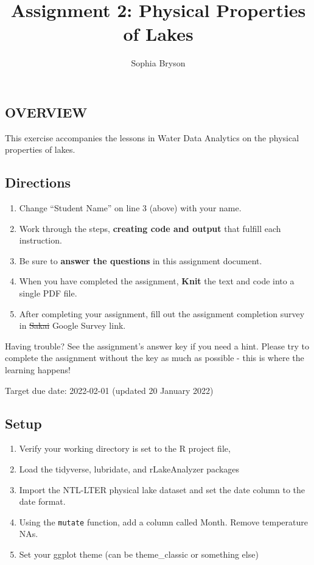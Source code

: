 \documentclass[
]{article}
\title{Assignment 2: Physical Properties of Lakes}
\author{Sophia Bryson}
\date{}
\providecommand{\tightlist}{%
  \setlength{\itemsep}{0pt}\setlength{\parskip}{0pt}}
\begin{document}
\maketitle

\hypertarget{overview}{%
\subsection{OVERVIEW}\label{overview}}

This exercise accompanies the lessons in Water Data Analytics on the
physical properties of lakes.

\hypertarget{directions}{%
\subsection{Directions}\label{directions}}

\begin{enumerate}
\def\labelenumi{\arabic{enumi}.}
\tightlist
\item
  Change ``Student Name'' on line 3 (above) with your name.
\item
  Work through the steps, \textbf{creating code and output} that fulfill
  each instruction.
\item
  Be sure to \textbf{answer the questions} in this assignment document.
\item
  When you have completed the assignment, \textbf{Knit} the text and
  code into a single PDF file.
\item
  After completing your assignment, fill out the assignment completion
  survey in \sout{Sakai} Google Survey link.
\end{enumerate}

Having trouble? See the assignment's answer key if you need a hint.
Please try to complete the assignment without the key as much as
possible - this is where the learning happens!

Target due date: 2022-02-01 (updated 20 January 2022)

\hypertarget{setup}{%
\subsection{Setup}\label{setup}}

\begin{enumerate}
\def\labelenumi{\arabic{enumi}.}
\tightlist
\item
  Verify your working directory is set to the R project file,
\item
  Load the tidyverse, lubridate, and rLakeAnalyzer packages
\item
  Import the NTL-LTER physical lake dataset and set the date column to
  the date format.
\item
  Using the \texttt{mutate} function, add a column called Month. Remove
  temperature NAs.
\item
  Set your ggplot theme (can be theme\_classic or something else)
\end{enumerate}
\end{document}
